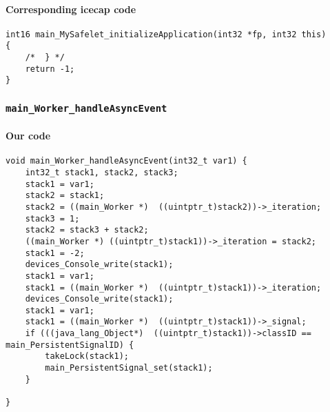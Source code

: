 \begin{landscape}
\begin{multicols}{2}
\paragraph{Corresponding icecap code}\hfill
\begin{lstlisting}[firstnumber=54500]
int16 main_MySafelet_initializeApplication(int32 *fp, int32 this)
{
	/*	} */
	return -1;
}
\end{lstlisting}

\subsubsection{\texttt{main\_Worker\_handleAsyncEvent}}

\paragraph{Our code}\hfill
\begin{lstlisting}[firstnumber=2230]
void main_Worker_handleAsyncEvent(int32_t var1) {
	int32_t stack1, stack2, stack3;
	stack1 = var1;
	stack2 = stack1;
	stack2 = ((main_Worker *)  ((uintptr_t)stack2))->_iteration;
	stack3 = 1;
	stack2 = stack3 + stack2;
	((main_Worker *) ((uintptr_t)stack1))->_iteration = stack2;
	stack1 = -2;
	devices_Console_write(stack1);
	stack1 = var1;
	stack1 = ((main_Worker *)  ((uintptr_t)stack1))->_iteration;
	devices_Console_write(stack1);
	stack1 = var1;
	stack1 = ((main_Worker *)  ((uintptr_t)stack1))->_signal;
	if (((java_lang_Object*)  ((uintptr_t)stack1))->classID == main_PersistentSignalID) {
		takeLock(stack1);
		main_PersistentSignal_set(stack1);
	}

}
\end{lstlisting}


\end{multicols}
\end{landscape}
